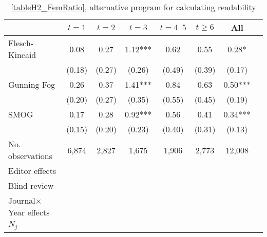 \begin{table}
    \footnotesize
    \centering
    \begin{threeparttable}
        \caption{\autoref{tableH2_FemRatio}, alternative program for calculating readability}
        \label{tableH2_R}
        \begin{tabular}{p{3cm}S@{}S@{}S@{}S@{}S@{}S@{}S@{}}
            \toprule
            &{\(t=1\)}&{\(t=2\)}&{\(t=3\)}&{\(t=4\text{--}5\)}&{\(t\ge6\)}&{All}\\
            \midrule
            Flesch-Kincaid                &        0.08   &        0.27   &        1.12***&        0.62   &        0.55   &        0.28*  \\
                                          &      (0.18)   &      (0.27)   &      (0.26)   &      (0.49)   &      (0.39)   &      (0.17)   \\
            Gunning Fog                   &        0.26   &        0.37   &        1.41***&        0.84   &        0.63   &        0.50***\\
                                          &      (0.20)   &      (0.27)   &      (0.35)   &      (0.55)   &      (0.45)   &      (0.19)   \\
            SMOG                          &        0.17   &        0.28   &        0.92***&        0.56   &        0.41   &        0.34***\\
                                          &      (0.15)   &      (0.20)   &      (0.23)   &      (0.40)   &      (0.31)   &      (0.13)   \\
            \midrule
            No. observations              &       6,874   &       2,827   &       1,675   &       1,906   &       2,773   &      12,008   \\
            \midrule
            Editor effects       &           {}   &           {}   &           {}   &           {}   &           {}   &           {}   \\
            Blind review                  &           {}   &           {}   &           {}   &           {}   &           {}   &               \\
            Journal\(\times\)Year effects          &           {}   &           {}   &           {}   &           {}   &           {}   &           {}   \\
            \(N_j\)                       &           {}   &           {}   &           {}   &           {}   &           {}   &           {}   \\

\end{tabular}
\end{threeparttable}
\end{table}
